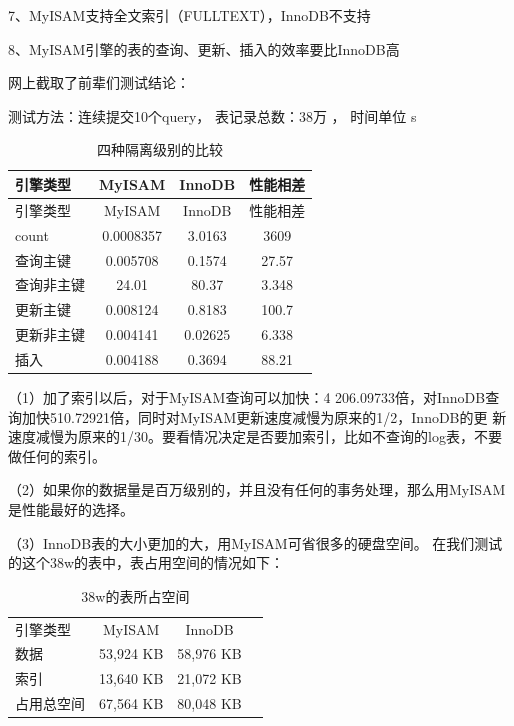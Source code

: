 \documentclass[UTF8]{ctexart}
\begin{document}
7、MyISAM支持全文索引（FULLTEXT），InnoDB不支持

8、MyISAM引擎的表的查询、更新、插入的效率要比InnoDB高

网上截取了前辈们测试结论： 

测试方法：连续提交10个query， 表记录总数：38万 ， 时间单位 s
\begin{table}[]
    \caption{四种隔离级别的比较}
    \vspace{20pt}
    \centering
    \begin{tabular}{|l||c|c|c|}
        \hline
        引擎类型 &MyISAM&InnoDB&性能相差\\
        \hline
        引擎类型&MyISAM&InnoDB&性能相差\\
        count&0.0008357&3.0163&3609\\
        查询主键&0.005708&0.1574&27.57\\
        查询非主键&24.01&80.37&3.348\\
        更新主键&0.008124&0.8183&100.7\\
        更新非主键&0.004141&0.02625&6.338\\
        插入&0.004188&0.3694&88.21\\
        \hline       
    \end{tabular}
    \label{bs3}
\end{table}
（1）加了索引以后，对于MyISAM查询可以加快：4 206.09733倍，对InnoDB查询加快510.72921倍，同时对MyISAM更新速度减慢为原来的1/2，InnoDB的更
  新速度减慢为原来的1/30。要看情况决定是否要加索引，比如不查询的log表，不要做任何的索引。
 
 （2）如果你的数据量是百万级别的，并且没有任何的事务处理，那么用MyISAM是性能最好的选择。
 
 （3）InnoDB表的大小更加的大，用MyISAM可省很多的硬盘空间。
        在我们测试的这个38w的表中，表占用空间的情况如下：
   \begin{table}[]
    \caption{38w的表所占空间}
    \vspace{20pt}
    \centering
    \begin{tabular}{|l|c|c|c|}
        \hline
            引擎类型       &             MyISAM     &        InnoDB\\
            数据            &          53,924 KB      &    58,976 KB\\
            索引             &         13,640 KB     &     21,072 KB\\
            占用总空间      &        67,564 KB       &   80,048 KB\\
          \hline       
    \end{tabular}
    \label{bs4}
\end{table}
\end{document}
